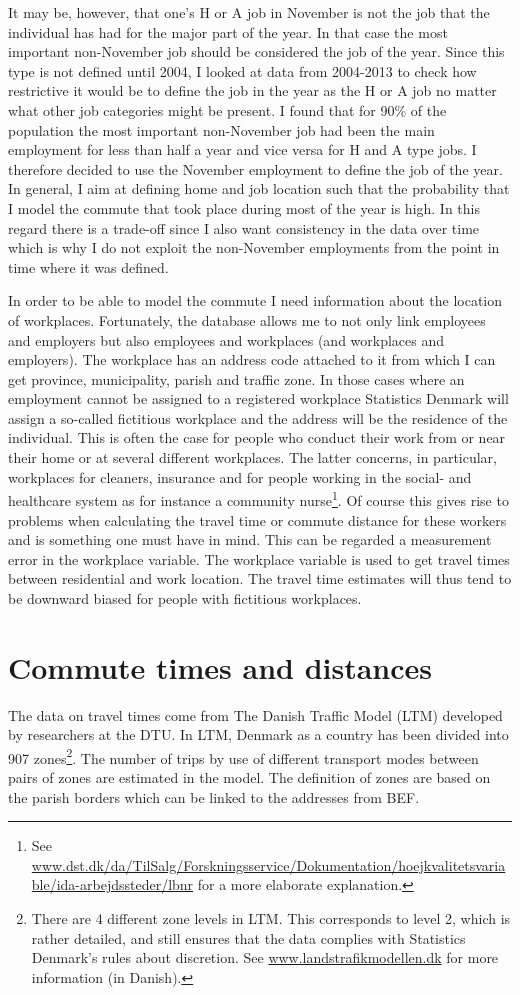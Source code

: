 It may be, however, that one's H or A job in November is not the job that the individual has had for the major part of the year. In that case the most important non-November job should be considered the job of the year. Since this type is not defined until 2004, I looked at data from 2004-2013 to check how restrictive it would be to define the job in the year as the H or A job no matter what other job categories might be present. I found that for 90\% of the population the most important non-November job had been the main employment for less than half a year and vice versa for H and A type jobs. I therefore decided to use the November employment to define the job of the year. In general, I aim at defining home and job location such that the probability that I model the commute that took place during most of the year is high. In this regard there is a trade-off since I also want consistency in the data over time which is why I do not exploit the non-November employments from the point in time where it was defined. 

In order to be able to model the commute I need information about the location of workplaces. Fortunately, the database allows me to not only link employees and employers but also employees and workplaces (and workplaces and employers). The workplace has an address code attached to it from which I can get province, municipality, parish and traffic zone. In those cases where an employment cannot be assigned to a registered workplace Statistics Denmark will assign a so-called fictitious workplace and the address will be the residence of the individual. This is often the case for people who conduct their work from or near their home or at several different workplaces. The latter concerns, in particular, workplaces for cleaners, insurance and for people working in the social- and healthcare system as for instance a community nurse\footnote{See \url{www.dst.dk/da/TilSalg/Forskningsservice/Dokumentation/hoejkvalitetsvariable/ida-arbejdssteder/lbnr} for a more elaborate explanation.}. Of course this gives rise to problems when calculating the travel time or commute distance for these workers and is something one must have in mind. This can be regarded a measurement error in the workplace variable. The workplace variable is used to get travel times between residential and work location. The travel time estimates will thus tend to be downward biased for people with fictitious workplaces. 

\section{Commute times and distances}
The data on travel times come from The Danish Traffic Model (LTM) developed by researchers at the DTU. In LTM, Denmark as a country has been divided into 907 zones\footnote{There are 4 different zone levels in LTM. This corresponds to level 2, which is rather detailed, and still ensures that the data complies with Statistics Denmark's rules about discretion. See \url{www.landstrafikmodellen.dk} for more information (in Danish).}. The number of trips by use of different transport modes between pairs of zones are estimated in the model. The definition of zones are based on the parish borders which can be linked to the addresses from BEF.

